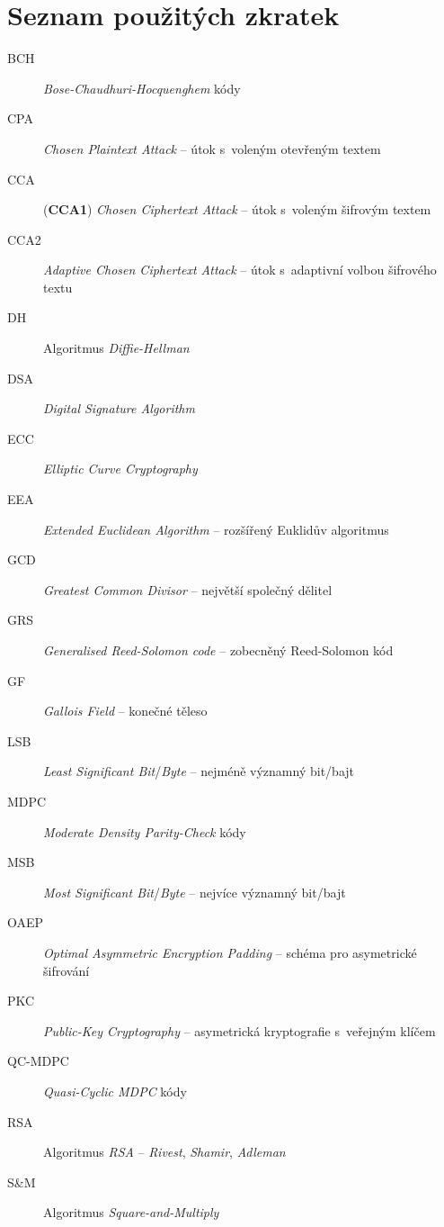 \documentclass[thesis=M,czech,hidelinks]{FITthesis}[2012/06/26]
\newcommand{\0}{{\textcolor[gray]{0.75}{0}}}
\begin{document}
\appendix

\chapter{Seznam použitých zkratek}
\begin{description}
    \item[BCH]      \emph{Bose-Chaudhuri-Hocquenghem} kódy
    \item[CPA]      \emph{Chosen Plaintext Attack} -- útok s~voleným otevřeným textem
    \item[CCA]      (\textbf{CCA1}) \emph{Chosen Ciphertext Attack} -- útok s~voleným šifrovým textem
    \item[CCA2]     \emph{Adaptive Chosen Ciphertext Attack} -- útok s~adaptivní volbou šifrového textu
    \item[DH]       Algoritmus \emph{Diffie-Hellman}
    \item[DSA]      \emph{Digital Signature Algorithm}
    \item[ECC]      \emph{Elliptic Curve Cryptography}
    \item[EEA]      \emph{Extended Euclidean Algorithm} -- rozšířený Euklidův algoritmus
    \item[GCD]      \emph{Greatest Common Divisor} -- největší společný dělitel
    \item[GRS]      \emph{Generalised Reed-Solomon code} -- zobecněný Reed-Solomon kód
    \item[GF]       \emph{Gallois Field} -- konečné těleso
    \item[LSB]      \emph{Least Significant Bit}/\emph{Byte} -- nejméně významný bit/bajt
    \item[MDPC]     \emph{Moderate Density Parity-Check} kódy
    \item[MSB]      \emph{Most Significant Bit}/\emph{Byte} -- nejvíce významný bit/bajt
    \item[OAEP]     \emph{Optimal Asymmetric Encryption Padding} -- schéma pro asymetrické šifrování
    \item[PKC]      \emph{Public-Key Cryptography} -- asymetrická kryptografie s~veřejným klíčem
    \item[QC-MDPC]  \emph{Quasi-Cyclic MDPC} kódy
    \item[RSA]      Algoritmus \emph{RSA} -- \emph{Rivest}, \emph{Shamir}, \emph{Adleman}
    \item[S\&M]     Algoritmus \emph{Square-and-Multiply}
\end{description}
\end{document}
